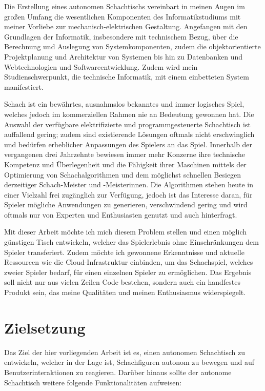 Die Erstellung eines autonomen Schachtischs vereinbart in meinen Augen
im großen Umfang die wesentlichen Komponenten des Informatikstudiums mit
meiner Vorliebe zur mechanisch-elektrischen Gestaltung. Angefangen mit
den Grundlagen der Informatik, insbesondere mit technischem Bezug, über
die Berechnung und Auslegung von Systemkomponenten, zudem die
objektorientierte Projektplanung und Architektur von Systemen bis hin zu
Datenbanken und Webtechnologien und Softwareentwicklung. Zudem wird mein
Studienschwerpunkt, die technische Informatik, mit einem einbetteten
System manifestiert.

Schach ist ein bewährtes, ausnahmslos bekanntes und immer logisches
Spiel, welches jedoch im kommerziellen Rahmen nie an Bedeutung gewonnen
hat. Die Auswahl der verfügbare elektrifizierte und programmgesteuerte
Schachtisch ist auffallend gering; zudem sind existierende Lösungen
oftmals nicht erschwinglich und bedürfen erheblicher Anpassungen des
Spielers an das Spiel. Innerhalb der vergangenen drei Jahrzehnte
bewiesen immer mehr Konzerne ihre technische Kompetenz und Überlegenheit
und die Fähigkeit ihrer Maschinen mittels der Optimierung von
Schachalgorithmen und dem möglichst schnellen Besiegen derzeitiger
Schach-Meister und -Meisterinnen. Die Algorithmen stehen heute in einer
Vielzahl frei zugänglich zur Verfügung, jedoch ist das Interesse daran,
für Spieler mögliche Anwendungen zu generieren, verschwindend gering und
wird oftmals nur von Experten und Enthusiasten genutzt und auch
hinterfragt.

Mit dieser Arbeit möchte ich mich diesem Problem stellen und einen
möglich günstigen Tisch entwickeln, welcher das Spielerlebnis ohne
Einschränkungen dem Spieler transferiert. Zudem möchte ich gewonnene
Erkenntnisse und aktuelle Ressourcen wie die Cloud-Infrastruktur
einbinden, um das Schachspiel, welches zweier Spieler bedarf, für einen
einzelnen Spieler zu ermöglichen. Das Ergebnis soll nicht nur aus vielen
Zeilen Code bestehen, sondern auch ein handfestes Produkt sein, das
meine Qualitäten und meinen Enthusiasmus widerspiegelt.

\hypertarget{zielsetzung}{%
\section{Zielsetzung}\label{zielsetzung}}

Das Ziel der hier vorliegenden Arbeit ist es, einen autonomen
Schachtisch zu entwickeln, welcher in der Lage ist, Schachfiguren
autonom zu bewegen und auf Benutzerinteraktionen zu reagieren. Darüber
hinaus sollte der autonome Schachtisch weitere folgende Funktionalitäten
aufweisen:

